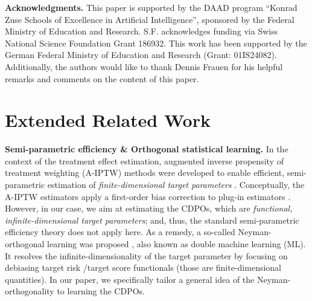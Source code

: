\documentclass[dvipsnames]{article} %
\newcommand{\CDPOs}{CDPOs\xspace}
\begin{document}
\newpage
\textbf{Acknowledgments.} This paper is supported by the DAAD program “Konrad Zuse Schools of Excellence in Artificial Intelligence”, sponsored by the Federal Ministry of Education and Research. S.F. acknowledges funding via Swiss National Science Foundation Grant 186932. This work has been supported by the German Federal Ministry of Education and Research (Grant: 01IS24082). Additionally, the authors would like to thank Dennis Frauen for his helpful remarks and comments on the content of this paper.





\appendix
\newpage
\section{Extended Related Work} \label{app:extended-rw}
{\textbf{Semi-parametric efficiency \& Orthogonal statistical learning.} In the context of the treatment effect estimation, augmented inverse propensity of treatment weighting (A-IPTW) methods were developed to enable efficient, semi-parametric estimation of \emph{finite-dimensional target parameters} \citep{newey1994asymptotic,robins2000robust}. Conceptually, the A-IPTW estimators apply a first-order bias correction to plug-in estimators \citep{bickel1993efficient,tsiatis2006semiparametric}. However, in our case, we aim at estimating the \CDPOs, which are \emph{functional, infinite-dimensional target parameters}; and, thus, the standard semi-parametric efficiency theory does not apply here. As a remedy, a so-called  Neyman-orthogonal learning was proposed \citep{laan2003unified,laan2006statistical,chernozhukov2018double,semenova2021debiased,kennedy2023towards,foster2023orthogonal,morzywolek2023general,vansteelandt2025orthogonal}, also known as double machine learning (ML). It resolves the infinite-dimensionality of the target parameter by focusing on debiasing target risk /target score functionals (those are finite-dimensional quantities). In our paper, we specifically tailor a general idea of the Neyman-orthogonality to learning the \CDPOs.    
}
\end{document}
